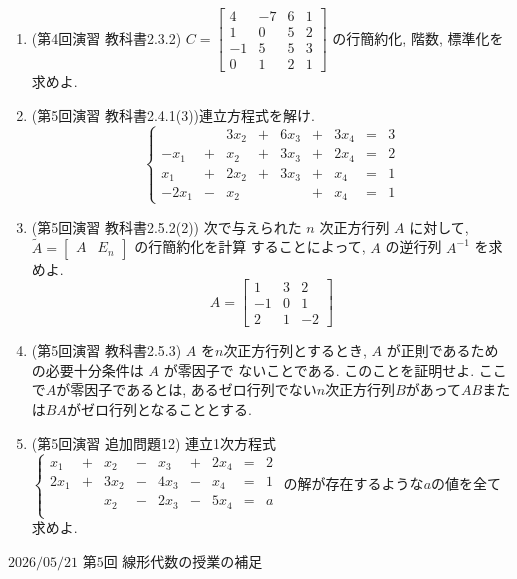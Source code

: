 \documentclass[dvipdfmx,a4paper,11pt]{article} %
\theoremstyle{definition}
\begin{document}
\begin{enumerate}[label=\textbf{問題}\arabic*.]
いことを証明せよ.
\item (第4回演習 教科書2.3.2)
$
C=
\begin{bmatrix}
4 & -7 & 6 & 1\\
1 & 0 & 5 & 2\\
-1 & 5 & 5 & 3\\
0 & 1 & 2 & 1
\end{bmatrix}
 $
 の行簡約化, 階数, 標準化を求めよ. 
\item (第5回演習 教科書2.4.1(3))連立方程式を解け. 
\[
\left\{
\begin{matrix}
     &  & 3x_2 & + & 6x_3 & + & 3x_4 & = & 3\\
-x_1 & + & x_2 & + & 3x_3 & + & 2x_4 & = & 2\\
 x_1 & + & 2x_2 & + & 3x_3 & + & x_4 & = & 1\\
-2x_1 & - & x_2 &  &  & + & x_4 & = & 1
\end{matrix}
\right.
\]
 \item (第5回演習 教科書2.5.2(2))
  次で与えられた \(n\) 次正方行列 \(A\) に対して,
\(
\widetilde{A}=
\begin{bmatrix}
A & E_n
\end{bmatrix}
\)
の行簡約化を計算
することによって, \(A\) の逆行列 \(A^{-1}\) を求めよ.
\[
A=
\begin{bmatrix}
1 & 3 & 2\\
-1 & 0 & 1\\
2 & 1 & -2
\end{bmatrix}
\]
 \item (第5回演習 教科書2.5.3)
\(A\) を$n$次正方行列とするとき, \(A\) が正則であるための必要十分条件は \(A\) が零因子で
ないことである. このことを証明せよ.
ここで$A$が零因子であるとは, あるゼロ行列でない$n$次正方行列$B$があって$AB$または$BA$がゼロ行列となることとする. 
\item (第5回演習 追加問題12)
 連立1次方程式
 $
 \left\{ 
\begin{matrix}
x_1& +& x_2 &  -& x_3& + &2x_4&= & 2\\
2x_1&+&3x_2& -&4x_3&-&x_4&= & 1\\
	& &x_2& - &2x_3&-&5x_4&=&a \\
\end{matrix}
\right.
 $
 の解が存在するような$a$の値を全て求めよ.
\end{enumerate}
\newpage

$\boxed{\text{2026/05/21 第5回 線形代数の授業の補足}}$
\end{document}
